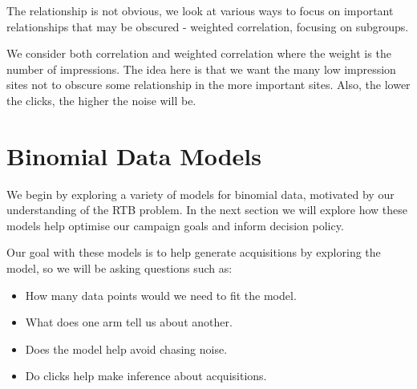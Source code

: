 \documentclass[11pt,a4,singlespacing,titlepagenumber=on]{scrreprt}
\numberwithin{equation}{chapter} %
\theoremstyle{remark}
\begin{document}
The relationship is not obvious, we look at various ways to focus on important relationships that may be obscured - weighted correlation, focusing on subgroups.

We consider both correlation and weighted correlation where the weight is the number of impressions. The idea here is that we want the many low impression sites not to obscure some relationship in the more important sites. Also, the lower the clicks, the higher the noise will be.


\chapter{Binomial Data Models}

We begin by exploring a variety of models for binomial data, motivated by our understanding of the RTB problem. In the next section we will explore how these models help optimise our campaign goals and inform decision policy.

Our goal with these models is to help generate acquisitions by exploring the model, so we will be asking questions such as:
\begin{itemize}
	\item How many data points would we need to fit the model.
	\item What does one arm tell us about another.
	\item Does the model help avoid chasing noise.
	\item Do clicks help make inference about acquisitions.
\end{itemize}




\end{document}
